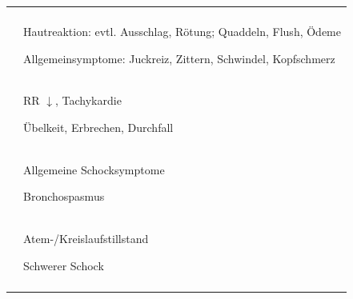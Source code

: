 \begin{table}[H]
\CorrectionItemizeBox\FontTableBase
{}
\begin{tabulary}{\linewidth}[H]{cL}\addlinespace\toprule\addlinespace
\noindent{}
 &
\noindent{}
\\\addlinespace\midrule\addlinespace
{}
 &
Hautreaktion: evtl. Ausschlag, Rötung;
{Quaddeln}, Flush, Ödeme

Allgemeinsymptome: Juckreiz, Zittern, Schwindel, Kopfschmerz

\\\addlinespace
{}

 &
RR ${\downarrow}$, Tachykardie

Übelkeit, Erbrechen, Durchfall 

\\\addlinespace
{}
 &
Allgemeine Schocksymptome

Bronchospasmus
\\\addlinespace
{}
 &
Atem-/Kreislaufstillstand

Schwerer Schock
\\\addlinespace\bottomrule
\end{tabulary}
\end{table}


